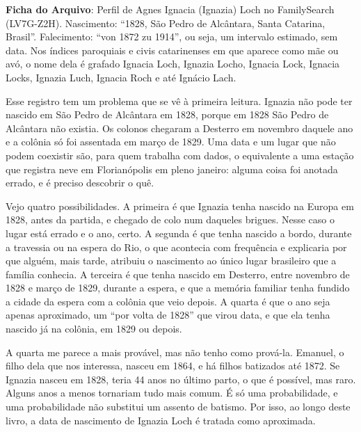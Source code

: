 \documentclass[
  brazilian,
  11pt,
  openany]{book}
\begin{document}
\begin{ficha}

\textbf{Ficha do Arquivo}: Perfil de Agnes Ignacia (Ignazia) Loch no
FamilySearch (LV7G-Z2H). Nascimento: ``1828, São Pedro de Alcântara,
Santa Catarina, Brasil''. Falecimento: ``von 1872 zu 1914'', ou seja, um
intervalo estimado, sem data. Nos índices paroquiais e civis
catarinenses em que aparece como mãe ou avó, o nome dela é grafado
Ignacia Loch, Ignazia Locho, Ignacia Lock, Ignacia Locks, Ignazia Luch,
Ignacia Roch e até Ignácio Lach.

\end{ficha}

Esse registro tem um problema que se vê à primeira leitura. Ignazia não
pode ter nascido em São Pedro de Alcântara em 1828, porque em 1828 São
Pedro de Alcântara não existia. Os colonos chegaram a Desterro em
novembro daquele ano e a colônia só foi assentada em março de 1829. Uma
data e um lugar que não podem coexistir são, para quem trabalha com
dados, o equivalente a uma estação que registra neve em Florianópolis em
pleno janeiro: alguma coisa foi anotada errado, e é preciso descobrir o
quê.

Vejo quatro possibilidades. A primeira é que Ignazia tenha nascido na
Europa em 1828, antes da partida, e chegado de colo num daqueles
brigues. Nesse caso o lugar está errado e o ano, certo. A segunda é que
tenha nascido a bordo, durante a travessia ou na espera do Rio, o que
acontecia com frequência e explicaria por que alguém, mais tarde,
atribuiu o nascimento ao único lugar brasileiro que a família conhecia.
A terceira é que tenha nascido em Desterro, entre novembro de 1828 e
março de 1829, durante a espera, e que a memória familiar tenha fundido
a cidade da espera com a colônia que veio depois. A quarta é que o ano
seja apenas aproximado, um ``por volta de 1828'' que virou data, e que
ela tenha nascido já na colônia, em 1829 ou depois.

A quarta me parece a mais provável, mas não tenho como prová-la.
Emanuel, o filho dela que nos interessa, nasceu em 1864, e há filhos
batizados até 1872. Se Ignazia nasceu em 1828, teria 44 anos no último
parto, o que é possível, mas raro. Alguns anos a menos tornariam tudo
mais comum. É só uma probabilidade, e uma probabilidade não substitui um
assento de batismo. Por isso, ao longo deste livro, a data de nascimento
de Ignazia Loch é tratada como aproximada.
\end{document}
